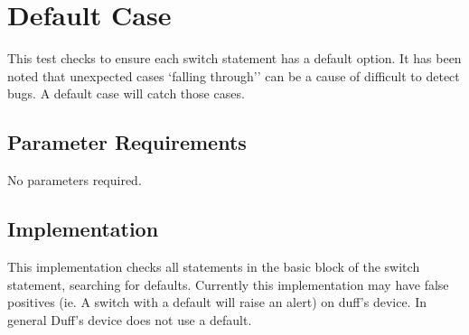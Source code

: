 %
%

\section{Default Case}
\label{DefaultCase::overview}
This test checks to ensure each switch statement has a default
option.  It has been noted that                                                                        
 unexpected cases `falling through'' can be a cause of difficult to
 detect bugs.  A default case will catch those cases. 

\subsection{Parameter Requirements}

No parameters required.

\subsection{Implementation}

This implementation checks all statements in the basic                                                                                                               
 block of the switch statement, searching for defaults.  Currently
 this implementation may have false positives (ie. A switch with a
 default will raise an alert) on duff's device.  In general Duff's device does not use
 a default.

